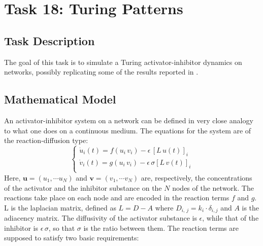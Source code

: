 \chapter{Task 18: Turing Patterns}

\section{Task Description}
The goal of this task is to simulate a Turing activator-inhibitor dynamics on networks, possibly replicating some of the results reported in \cite{main_network}. 
\section{Mathematical Model}
An activator-inhibitor system on a network can be defined in very close analogy to what one does on a continuous medium. 
The equations for the system are of the reaction-diffusion type:
$$
\begin{cases}
\dot{u}_i(t) = f(u_i\, v_i) - \epsilon\,[L\,u(t)]_i \\
\dot{v}_i(t) = g(u_i\, v_i) - \epsilon\, \sigma [L\,v(t)]_i \\
\end{cases}
$$
Here, $\mathbf{u} = (u_1, \cdots u_N)$ and $\mathbf{v} = (v_1, \cdots v_N)$ are, respectively, the concentrations of the activator and the inhibitor substance on the $N$ nodes of the network. The reactions take place on each node and are encoded in the reaction terms $f$ and $g$. L is the laplacian matrix, defined as $L=D-A$ where $D_{i,\,j}=k_i \cdot \delta_{i,j}$ and $A$ is the adiacency matrix. The diffusivity of the activator substance is $\epsilon$, while that of the inhibitor is $\epsilon\,\sigma$, so that $\sigma$ is the ratio between them. The reaction terms are supposed to satisfy two basic requirements:
